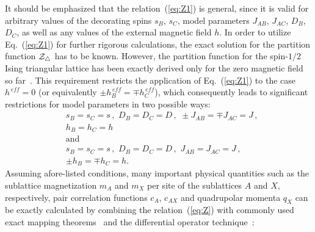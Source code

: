 \documentclass[final,5p,times,sort&compress]{elsarticle}
\begin{document}
It should be emphasized that the relation~(\ref{eq:Z1}) is general, since it is valid for arbitrary values of the decorating spins $s_{B}$, $s_{C}$, model parameters $J_{AB}$, $J_{AC}$, $D_{B}$, $D_{C}$, as well as any values of the external magnetic field $h$. In order to utilize Eq.~(\ref{eq:Z1}) for further rigorous calculations, the exact solution for the partition function ${\cal Z}_{\triangle}$ has to be known. However, the partition function for the spin-$1/2$ Ising triangular lattice has been exactly derived only for the zero magnetic field so far~\cite{Hou50}. This requirement restricts the application of Eq.~(\ref{eq:Z1}) to the case $h^{\,e\!f\!f} = 0$ (or equivalently $\pm h_{B}^{\,e\!f\!f} = \mp h_{C}^{\,e\!f\!f}$), which consequently leads to significant restrictions for model parameters in two possible ways:
\begin{subequations}
\begin{align}
\label{eq:restriction1}
&s_{B} = s_{C} = s\,,\,\, D_{B} = D_{C} = D\,, \,\, \pm J_{AB} = \mp J_{AC} = J\,,
\nonumber\\
&h_{B} = h_{C} = h\\
&\textrm{and}\nonumber\\
\label{eq:restriction2}
&s_{B} = s_{C} = s\,,\,\,  D_{B} = D_{C} = D\,, \,\, J_{AB} = J_{AC} = J\,,
\nonumber\\
&\pm h_{B} = \mp h_{C} = h.
\end{align}
\end{subequations}
Assuming afore-listed conditions, many important physical \linebreak quantities such as the sublattice magnetization $m_A$ and $m_X$ per site of the sublattices $A$ and $X$, respectively, pair correlation functions $c_{A}$, $c_{AX}$ and quadrupolar momenta $q_{X}$ can be exactly calculated by combining the relation~(\ref{eq:Z}) with commonly used exact mapping theorems~\cite{Bar88, Kha90, Bar95} and the differential operator technique~\cite{Hon79, Kan93, Kan97}:
\end{document}

